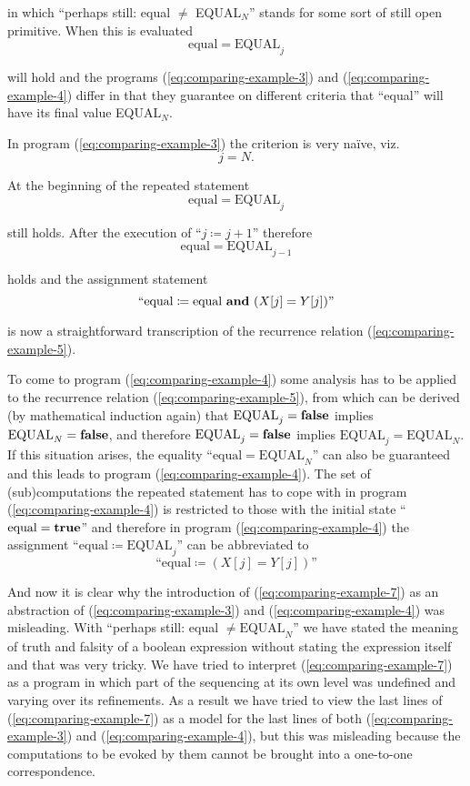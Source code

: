 \noindent
in which ``perhaps still: equal $\neq$ EQUAL$_N$'' stands for some sort of still open primitive. When this is evaluated
$$
\text{equal} = \text{EQUAL}_j
$$

\noindent
will hold and the programs (\ref{eq:comparing-example-3}) and (\ref{eq:comparing-example-4}) differ in that they guarantee on different criteria that ``equal'' will have its final value EQUAL$_N$.

In program (\ref{eq:comparing-example-3}) the criterion is very naïve, viz.
$$
j = N.
$$

\noindent
At the beginning of the repeated statement
$$
\text{equal} = \text{EQUAL}_j
$$

\noindent
still holds. After the execution of ``$j \coloneq j + 1$'' therefore
$$
\text{equal} = \text{EQUAL}_{j-1}
$$

\noindent
holds and the assignment statement
$$
\text{``equal} \coloneq \text{equal \textbf{and} } (X[j] = Y[j])\text{''}
$$

\noindent
is now a straightforward transcription of the recurrence relation (\ref{eq:comparing-example-5}).

To come to program (\ref{eq:comparing-example-4}) some analysis has to be applied to the recurrence relation (\ref{eq:comparing-example-5}), from which can be derived (by mathematical induction again) that $\text{EQUAL}_j = \text{\textbf{false}}$ implies $\text{EQUAL}_N = \text{\textbf{false}}$, and therefore $\text{EQUAL}_j = \text{\textbf{false}}$ implies $\text{EQUAL}_j = \text{EQUAL}_N$. If this situation arises, the equality ``$\text{equal} = \text{EQUAL}_N$'' can also be guaranteed and this leads to program (\ref{eq:comparing-example-4}). The set of (sub)computations the repeated statement has to cope with in program (\ref{eq:comparing-example-4}) is restricted to those with the initial state ``$\text{equal} = \text{\textbf{true}}$'' and therefore in program (\ref{eq:comparing-example-4}) the assignment ``$\text{equal} \coloneq \text{EQUAL}_j$'' can be abbreviated to
$$
\text{``equal} \coloneq (X[j] = Y[j])\text{''}
$$

And now it is clear why the introduction of (\ref{eq:comparing-example-7}) as an abstraction of (\ref{eq:comparing-example-3}) and (\ref{eq:comparing-example-4}) was misleading. With ``perhaps still: equal $\neq \text{EQUAL}_N$'' we have stated the meaning of truth and falsity of a boolean expression without stating the expression itself and that was very tricky. We have tried to interpret (\ref{eq:comparing-example-7}) as a program in which part of the sequencing at its own level was undefined and varying over its refinements. As a result we have tried to view the last lines of (\ref{eq:comparing-example-7}) as a model for the last lines of both (\ref{eq:comparing-example-3}) and (\ref{eq:comparing-example-4}), but this was misleading because the computations to be evoked by them cannot be brought into a one-to-one correspondence.

